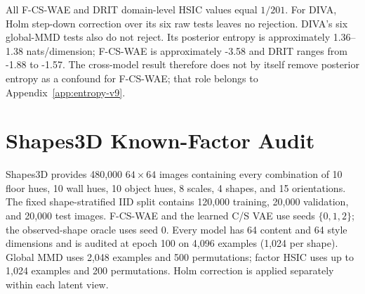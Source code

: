 All F-CS-WAE and DRIT domain-level HSIC values equal $1/201$.  For DIVA, Holm
step-down correction over its six raw tests leaves no rejection.  DIVA's six
global-MMD tests also do not reject.  Its posterior entropy is approximately
1.36--1.38 nats/dimension; F-CS-WAE is approximately -3.58 and DRIT ranges
from -1.88 to -1.57.  The cross-model result therefore does not by itself
remove posterior entropy as a confound for F-CS-WAE; that role belongs to
Appendix~\ref{app:entropy-v9}.

\section{Shapes3D Known-Factor Audit}
\label{app:shapes3d-v9}

Shapes3D provides 480,000 $64\times64$ images containing every combination of
10 floor hues, 10 wall hues, 10 object hues, 8 scales, 4 shapes, and 15
orientations.  The fixed shape-stratified IID split contains 120,000 training,
20,000 validation, and 20,000 test images.  F-CS-WAE and the learned C/S VAE
use seeds $\{0,1,2\}$; the observed-shape oracle uses seed 0.  Every model has
64 content and 64 style dimensions and is audited at epoch 100 on 4,096
examples (1,024 per shape).  Global MMD uses 2,048 examples and 500
permutations; factor HSIC uses
up to 1,024 examples and 200 permutations.  Holm correction is applied
separately within each latent view.

\begin{table}[ht]
\caption{Completed three-seed Shapes3D replication.  Entries are rounded
means over seeds $\{0,1,2\}$.  The observed-shape oracle remains a seed-0
auxiliary control and is reported in the main paper.}
\label{tab:shapes3d-aggregate-v9}
\centering
\scriptsize
\setlength{\tabcolsep}{3.5pt}
\end{table}

